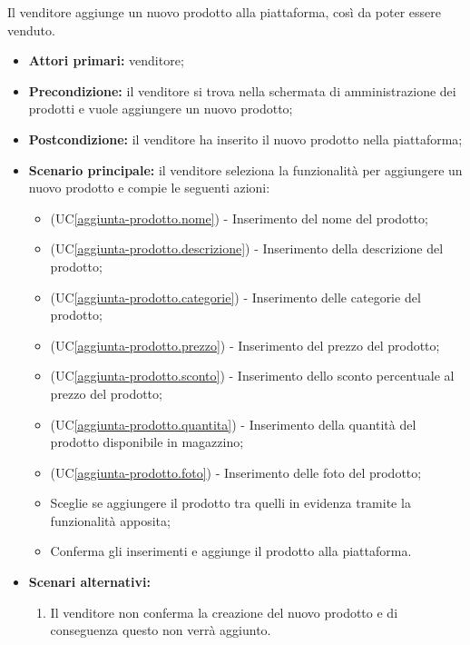 Il venditore aggiunge un nuovo prodotto alla piattaforma, così da poter essere venduto.
\begin{itemize}
    \item \textbf{Attori primari:} venditore;
    \item \textbf{Precondizione:} il venditore si trova nella schermata di amministrazione dei prodotti e vuole aggiungere un nuovo prodotto;
    \item \textbf{Postcondizione:} il venditore ha inserito il nuovo prodotto nella piattaforma;
    \item \textbf{Scenario principale:} il venditore seleziona la funzionalità per aggiungere un nuovo prodotto e compie le seguenti azioni:
    \begin{itemize}
        \item (UC\ref{aggiunta-prodotto.nome}) - Inserimento del nome del prodotto;
        \item (UC\ref{aggiunta-prodotto.descrizione}) - Inserimento della descrizione del prodotto;
        \item (UC\ref{aggiunta-prodotto.categorie}) - Inserimento delle categorie del prodotto;
        \item (UC\ref{aggiunta-prodotto.prezzo}) - Inserimento del prezzo del prodotto;
        \item (UC\ref{aggiunta-prodotto.sconto}) - Inserimento dello sconto percentuale al prezzo del prodotto;
        \item (UC\ref{aggiunta-prodotto.quantita}) - Inserimento della quantità del prodotto disponibile in magazzino;
        \item (UC\ref{aggiunta-prodotto.foto}) - Inserimento delle foto del prodotto;
        \item Sceglie se aggiungere il prodotto tra quelli in evidenza tramite la funzionalità apposita;
        \item Conferma gli inserimenti e aggiunge il prodotto alla piattaforma.
    \end{itemize}
    \item \textbf{Scenari alternativi:}
	\begin{enumerate}[label=\lett]
		\item Il venditore non conferma la creazione del nuovo prodotto e di conseguenza questo non verrà aggiunto.
	\end{enumerate}
\end{itemize}

\label{aggiunta-prodotto.nome}

